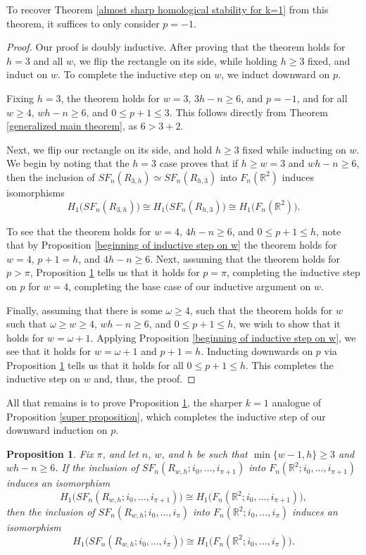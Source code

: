 \documentclass[pagebackref,colorlinks,citecolor=blue,linkcolor=blue,urlcolor=blue,filecolor=blue]{article}
\newtheorem{prop}[thm]{Proposition}
\theoremstyle{definition}\newtheorem{definition}[thm]{Definition}
\theoremstyle{definition}
\newcommand{\R}{\ensuremath{\mathbb{R}}}
\begin{document}
To recover Theorem \ref{almost sharp homological stability for k=1} from this theorem, it suffices to only consider $p=-1$.

\begin{proof}
Our proof is doubly inductive.
After proving that the theorem holds for $h=3$ and all $w$, we flip the rectangle on its side, while holding $h\ge 3$ fixed, and induct on $w$.
To complete the inductive step on $w$, we induct downward on $p$.

Fixing $h=3$, the theorem holds for $w=3$, $3h-n\ge6$, and $p=-1$, and for all $w\ge 4$, $wh-n\ge6$, and $0\le p+1\le 3$.
This follows directly from Theorem \ref{generalized main theorem}, as $6>3+2$.

Next, we flip our rectangle on its side, and hold $h\ge 3$ fixed while inducting on $w$.
We begin by noting that the $h=3$ case proves that if $h\ge w=3$ and $wh-n\ge 6$, then the inclusion of $SF_{n}(R_{3, h})\simeq SF_{n}(R_{h, 3})$ into $F_{n}(\R^{2})$ induces isomorphisms
\[
H_{1}\big(SF_{n}(R_{3, h})\big)\cong H_{1}\big(SF_{n}(R_{h, 3})\big)\cong H_{1}\big(F_{n}(\R^{2})\big).
\]

To see that the theorem holds for $w=4$, $4h-n\ge 6$, and $0\le p+1\le h$, note that by Proposition \ref{beginning of inductive step on w} the theorem holds for $w=4$, $p+1=h$, and $4h-n\ge 6$. 
Next, assuming that the theorem holds for $p>\pi$, Proposition \ref{inductive step on p for k=1} tells us that it holds for $p=\pi$, completing the inductive step on $p$ for $w=4$, completing the base case of our inductive argument on $w$.

Finally, assuming that there is some $\omega\ge 4$, such that the theorem holds for $w$ such that $\omega\ge w\ge 4$, $wh-n\ge 6$, and $0\le p+1\le h$, we wish to show that it holds for $w=\omega+1$.
Applying Proposition \ref{beginning of inductive step on w}, we see that it holds for $w=\omega+1$ and $p+1=h$.
Inducting downwards on $p$ via Proposition \ref{inductive step on p for k=1} tells us that it holds for all $0\le p+1\le h$.
This completes the inductive step on $w$ and, thus, the proof.
\end{proof}

All that remains is to prove Proposition \ref{inductive step on p for k=1}, the sharper $k=1$ analogue of Proposition \ref{super proposition}, which completes the inductive step of our downward induction on $p$.

\begin{prop}\label{inductive step on p for k=1}
Fix $\pi$, and let $n$, $w$, and $h$ be such that $\min\{w-1,h\}\ge 3$ and $wh-n\ge 6$.
If the inclusion of $SF_{n}(R_{w,h}; i_{0},\dots, i_{\pi+1})$ into $F_{n}(\R^{2}; i_{0},\dots, i_{\pi+1})$ induces an isomorphism 
\[
H_{1}\big(SF_{n}(R_{w,h}; i_{0},\dots, i_{\pi+1})\big)\cong H_{1}\big(F_{n}(\R^{2}; i_{0},\dots, i_{\pi+1})\big),
\]
then the inclusion of $SF_{n}(R_{w,h}; i_{0},\dots, i_{\pi})$ into $F_{n}(\R^{2}; i_{0},\dots, i_{\pi})$ induces an isomorphism 
\[
H_{1}\big(SF_{n}(R_{w,h}; i_{0},\dots, i_{\pi})\big)\cong H_{1}\big(F_{n}(\R^{2}; i_{0},\dots, i_{\pi})\big).
\]
\end{prop}
\end{document}

